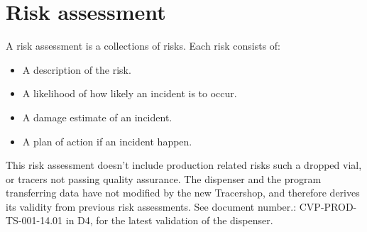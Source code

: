 \documentclass{article}
\begin{document}
\section*{Risk assessment}
A risk assessment is a collections of risks. Each risk consists of:
\begin{itemize}
  \item A description of the risk.
  \item A likelihood of how likely an incident is to occur.
  \item A damage estimate of an incident.
  \item A plan of action if an incident happen.
\end{itemize}
This risk assessment doesn't include production related risks such a dropped vial, or tracers not passing quality assurance.
The dispenser and the program transferring data have not modified by the new Tracershop, and therefore derives its validity from previous risk assessments.
See document number.: CVP-PROD-TS-001-14.01 in D4, for the latest validation of the dispenser.
\end{document}
